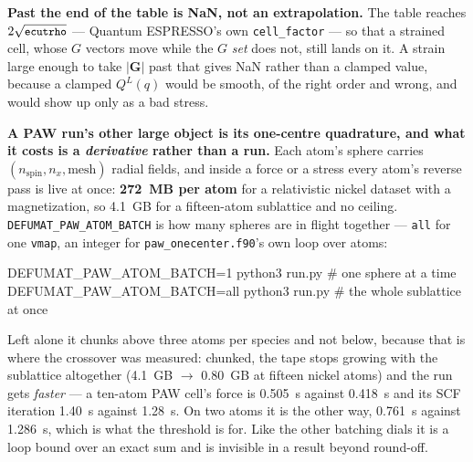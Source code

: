 \documentclass[11pt,a4paper]{article}
\newcommand{\qe}{Quantum ESPRESSO}
\newcommand{\code}[1]{\texttt{\small #1}}
\begin{document}
\begin{refuses}
\textbf{Past the end of the table is NaN, not an extrapolation.} The table
reaches $2\sqrt{\code{ecutrho}}$ --- \qe's own \code{cell\_factor} --- so that a
strained cell, whose $G$ vectors move while the $G$ \emph{set} does not, still
lands on it. A strain large enough to take $|\mathbf{G}|$ past that gives NaN
rather than a clamped value, because a clamped $Q^L(q)$ would be smooth, of the
right order and wrong, and would show up only as a bad stress.
\end{refuses}

\textbf{A PAW run's other large object is its one-centre quadrature, and what
it costs is a \emph{derivative} rather than a run.} Each atom's sphere carries
$(n_{\mathrm{spin}}, n_x, \text{mesh})$ radial fields, and inside a force or a
stress every atom's reverse pass is live at once: \textbf{272~MB per atom} for a
relativistic nickel dataset with a magnetization, so 4.1~GB for a fifteen-atom
sublattice and no ceiling. \code{DEFUMAT\_PAW\_ATOM\_BATCH} is how many spheres
are in flight together --- \code{all} for one \code{vmap}, an integer for
\code{paw\_onecenter.f90}'s own loop over atoms:

\begin{shcode}
DEFUMAT_PAW_ATOM_BATCH=1   python3 run.py   # one sphere at a time
DEFUMAT_PAW_ATOM_BATCH=all python3 run.py   # the whole sublattice at once
\end{shcode}

Left alone it chunks above three atoms per species and not below, because that
is where the crossover was measured: chunked, the tape stops growing with the
sublattice altogether (4.1~GB $\to$ 0.80~GB at fifteen nickel atoms) and the run
gets \emph{faster} --- a ten-atom PAW cell's force is 0.505~s against 0.418~s
and its SCF iteration 1.40~s against 1.28~s. On two atoms it is the other way,
0.761~s against 1.286~s, which is what the threshold is for. Like the other
batching dials it is a loop bound over an exact sum and is invisible in a result
beyond round-off.
\end{document}
